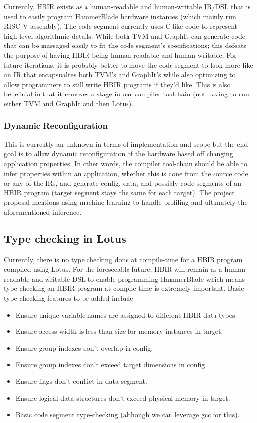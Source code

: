 \documentclass{article}
\begin{document}
Currently, HBIR exists as a human-readable and human-writable IR/DSL that is used to easily program HammerBlade hardware instances (which mainly run RISC-V assembly). The code segment currently uses C-like code to represent high-level algorithmic details. While both TVM and GraphIt can generate code that can be massaged easily to fit the code segment's specifications; this defeats the purpose of having HBIR being human-readable and human-writable. For future iterations, it is probably better to move the code segment to look more like an IR that encapsualtes both TVM's and GraphIt's while also optimizing to allow programmers to still write HBIR programs if they'd like. This is also beneficial in that it removes a stage in our compiler toolchain (not having to run either TVM and GraphIt and then Lotus). 

\subsubsection{Dynamic Reconfiguration}
This is currently an unknown in terms of implementation and scope but the end goal is to allow dynamic reconfiguration of the hardware based off changing application properties. In other words, the compiler tool-chain should be able to infer properties within an application, whether this is done from the source code or any of the IRs, and generate config, data, and possibly code segments of an HBIR program (target segment stays the same for each target). The project proposal mentions using machine learning to handle profiling and ultimately the aforementioned inference.

\subsection{Type checking in Lotus}
Currently, there is no type checking done at compile-time for a HBIR program compiled using Lotus. For the foreseeable future, HBIR will remain as a human-readable and writable DSL to enable programming HammerBlade which means type-checking an HBIR program at compile-time is extremely important. Basic type-checking features to be added include 
\begin{itemize}
    \item Ensure unique variable names are assigned to different HBIR data types.
    \item Ensure access width is less than size for memory instances in target.
    \item Ensure group indexes don't overlap in config.
    \item Ensure group indexes don't exceed target dimensions in config.
    \item Ensure flags don't conflict in data segment.
    \item Ensure logical data structures don't exceed physical memory in target.
    \item Basic code segment type-checking (although we can leverage gcc for this).
\end{itemize}
\end{document}
